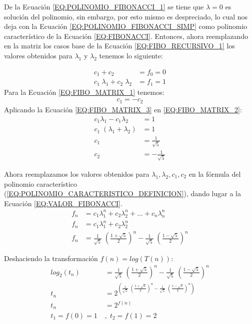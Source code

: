 De la Ecuación \ref{EQ:POLINOMIO_FIBONACCI_1} se tiene que $\lambda=0$ es solución del polinomio, sin embargo, por esto mismo es despreciado, lo cual nos deja con la Ecuación \ref{EQ:POLINOMIO_FIBONACCI_SIMP} como polinomio característico de la Ecuación \ref{EQ:FIBONACCI}. Entonces, ahora reemplazando en la matriz los casos base de la Ecuación \ref{EQ:FIBO_RECURSIVO_1} los valores obtenidos para $\lambda_1$ y $\lambda_2$ tenemos lo siguiente:

 
\begin{align}
	c_1 + c_2 &= f_0 = 0 \label{EQ:FIBO_MATRIX_1} \\
	c_1\;\lambda_{1} + c_2\;\lambda_{2} &= f_1 = 1 \label{EQ:FIBO_MATRIX_2}
\end{align}
Para la Ecuación \ref{EQ:FIBO_MATRIX_1} tenemos:
\begin{align}
	c_1 = -c_2 \label{EQ:FIBO_MATRIX_3}
\end{align}
Aplicando la Ecuación \ref{EQ:FIBO_MATRIX_3} en \ref{EQ:FIBO_MATRIX_2}:
\begin{align}
	c_1\lambda_1 - c_1\lambda_2&=1 \nonumber\\
	c_1\;(\lambda_1 +\lambda_2) &= 1\nonumber\\
	c_1 &= \frac{1}{\sqrt{5}} \nonumber\\
	c_2 &= -\frac{1}{\sqrt{5}} \nonumber
\end{align}

Ahora reemplazamos los valores obtenidos para $\lambda_1, \lambda_2, c_1, c_2$ en la fórmula del polinomio característico (\ref{EQ:POLINOMIO_CARACTERISTICO_DEFINICION}), dando lugar a la Ecuación \ref{EQ:VALOR_FIBONACCI}.
\begin{align}
	f_n &= c_1 \lambda_{1}^{n} + c_2 \lambda_{2}^{n} + \ldots + c_n \lambda_{n}^{n}\ \label{EQ:POLINOMIO_CARACTERISTICO_DEFINICION}\\	
	f_n &= c_1 \lambda_{1}^{n} + c_2 \lambda_{2}^{n}\nonumber\\	
	f_n &= \frac{1}{\sqrt{5}}\;\left(\frac{1+\sqrt{5}}{2}\right)^n -\frac{1}{\sqrt{5}}\;\left(\frac{1-\sqrt{5}}{2}\right)^n \label{EQ:VALOR_FIBONACCI}
\end{align}

Deshaciendo la transformación $f(n) = log(T(n))$:
\begin{align}
log_2(t_n)&= \frac{1}{\sqrt{5}}\;\left(\frac{1+\sqrt{5}}{2}\right)^n -\frac{1}{\sqrt{5}}\;\left(\frac{1-\sqrt{5}}{2}\right)^n \nonumber\\
t_n &= 2^{\left(\frac{1}{\sqrt{5}}\;\left(\frac{1+\sqrt{5}}{2}\right)^n -\frac{1}{\sqrt{5}}\;\left(\frac{1-\sqrt{5}}{2}\right)^n\right)}\nonumber\\
t_n&=2^{f(n)} \\
t_1 = f(0) = 1 \;&,\; t_2 = f(1) = 2
\end{align}

